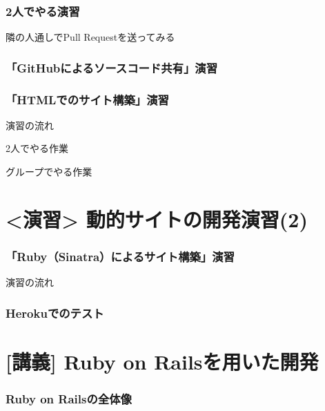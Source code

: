\documentclass[t, aspectratio=169]{beamer}
\begin{document}
\section{2人でやる演習}
\label{sec-8-2}
\begin{frame}[label=sec-8-2-1]{隣の人通しでPull Requestを送ってみる}
\end{frame}
\section{「GitHubによるソースコード共有」演習}
\label{sec-8-3}
\begin{frame}[label=sec-8-3-1]{}
\end{frame}
\section{「HTMLでのサイト構築」演習}
\label{sec-8-4}
\begin{frame}[label=sec-8-4-1]{演習の流れ}
\end{frame}
\begin{frame}[label=sec-8-4-2]{}
\end{frame}
\begin{frame}[label=sec-8-4-3]{2人でやる作業}
\end{frame}
\begin{frame}[label=sec-8-4-4]{グループでやる作業}
\end{frame}
\part{<演習> 動的サイトの開発演習(2)}
\label{sec-9}
\section{「Ruby（Sinatra）によるサイト構築」演習}
\label{sec-9-1}
\begin{frame}[label=sec-9-1-1]{演習の流れ}
\end{frame}
\section{Herokuでのテスト}
\label{sec-9-2}
\part{[講義] Ruby on Railsを用いた開発}
\label{sec-10}
\section{Ruby on Railsの全体像}
\label{sec-10-1}
\end{document}
